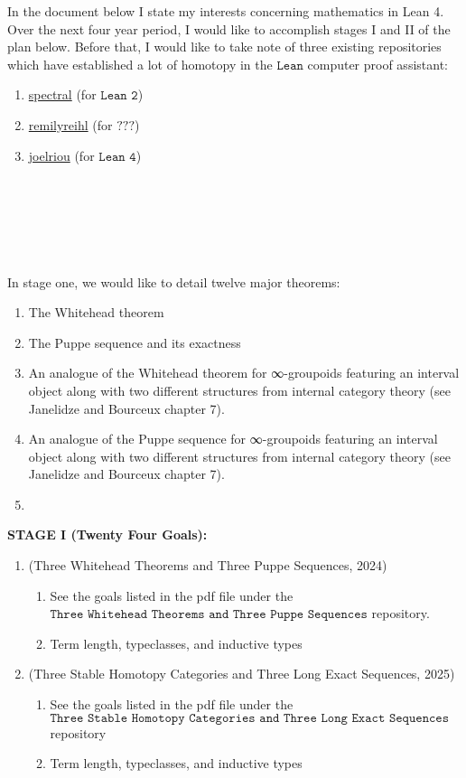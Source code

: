\documentclass{book}
\newcounter{pcounter}
\newcounter{sectioncount}
\newcounter{subsectioncount}
\renewcommand{\section}[1]{\newpage\ \\ \ \\ \begin{center} \scalebox{1.5}{\texttt{\thesectioncount . #1}} \stepcounter{sectioncount} \setcounter{subsectioncount}{1} \end{center} \begin{center} \ \\ \ \\ \thispagestyle{empty} \end{center}}
\begin{document}
In the document below I state my interests concerning mathematics in Lean 4. Over the next four year period, I would like to accomplish stages I and II of the plan below. Before that, I would like to take note of three existing repositories which have established a lot of homotopy in the $\texttt{Lean}$ computer proof assistant:

\begin{enumerate}
\item \href{https://github.com/cmu-phil/Spectral/blob/master/README.md}{spectral} (for $\texttt{Lean 2}$)
\item \href{https://github.com/emilyriehl}{remilyreihl} (for $\texttt{???}$)
\item \href{https://github.com/joelriou}{joelriou} (for $\texttt{Lean 4}$)
\end{enumerate}


\section{\scalebox{0.6}{Stage I: goals concerning homotopy and stable homotopy}}

In stage one, we would like to detail twelve major theorems:

\begin{enumerate}
\item The Whitehead theorem
\item The Puppe sequence and its exactness
\item An analogue of the Whitehead theorem for ∞-groupoids featuring an interval object along with two different structures from internal category theory (see Janelidze and Bourceux chapter 7).
\item An analogue of the Puppe sequence for ∞-groupoids featuring an interval object along with two different structures from internal category theory (see Janelidze and Bourceux chapter 7).
\item 
\end{enumerate}

{\bf STAGE I (Twenty Four Goals):}
\begin{enumerate}
\item (Three Whitehead Theorems and Three Puppe Sequences, 2024)
\begin{enumerate}
\item See the goals listed in the pdf file under the $\texttt{Three Whitehead Theorems and Three Puppe Sequences}$ repository.
\item Term length, typeclasses, and inductive types
\end{enumerate}
\item (Three Stable Homotopy Categories and Three Long Exact Sequences, 2025)
\begin{enumerate}
\item See the goals listed in the pdf file under the $\texttt{Three Stable Homotopy Categories and Three Long Exact Sequences}$ repository 
\item Term length, typeclasses, and inductive types
\end{enumerate}
\end{enumerate}
\end{document}
